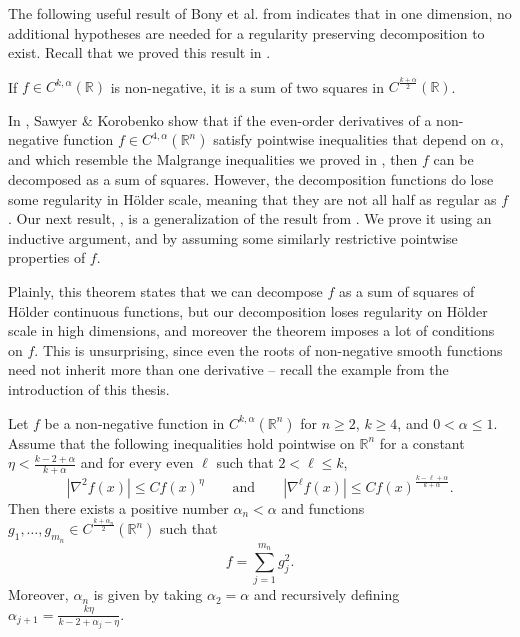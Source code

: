 \documentclass[oneside,hidelinks,indentfirst,10pt]{book}
\begin{document}
The following useful result of Bony et al. from \cite{Bony} indicates that in one dimension, no additional hypotheses are needed for a regularity preserving decomposition to exist. Recall that we proved this result in .


\begin{thm}[Bony]\label{thm:onedim}
If \(f\in C^{k,\alpha}(\mathbb{R})\) is non-negative, it is a sum of two squares in \(C^\frac{k+\alpha}{2}(\mathbb{R})\).
\end{thm}


In \cite[Theorem 4.5]{SOS_I}, Sawyer \& Korobenko show that if the even-order derivatives of a non-negative function \(f\in C^{4,\alpha}(\mathbb{R}^n)\) satisfy pointwise inequalities that depend on \(\alpha\), and which resemble the Malgrange inequalities we proved in , then \(f\) can be decomposed as a sum of squares. However, the decomposition functions do lose some regularity in H\"older scale, meaning that they are not all half as regular as \(f\). Our next result, , is a generalization of the result from \cite{SOS_I}. We prove it using an inductive argument, and by assuming some similarly restrictive pointwise properties of \(f\). 


Plainly, this theorem states that we can decompose \(f\) as a sum of squares of H\"older continuous functions, but our decomposition loses regularity on H\"older scale in high dimensions, and moreover the theorem imposes a lot of conditions on \(f\). This is unsurprising, since even the roots of non-negative smooth functions need not inherit more than one derivative -- recall the example from the introduction of this thesis. 


\begin{thm}\label{thm:seconddmain}
Let \(f\) be a non-negative function in \(C^{k,\alpha}(\mathbb{R}^n)\) for \(n\geq2\), \(k\geq 4\), and \(0<\alpha\leq 1\). Assume that the following inequalities hold pointwise on \(\mathbb{R}^n\) for a constant \(\eta<\frac{k-2+\alpha}{k+\alpha}\) and for every even \(\ell\) such that \(2<\ell\leq k\),
\begin{equation}\label{eq:induc}
    |\nabla^2 f(x)|\leq Cf(x)^\eta\qquad \textrm{and}\qquad|\nabla^\ell f(x)|\leq Cf(x)^\frac{k-\ell+\alpha}{k+\alpha}.
\end{equation}
Then there exists a positive number \(\alpha_n<\alpha\) and functions \(g_1,\dots,g_{m_n}\in C^\frac{k+\alpha_n}{2}(\mathbb{R}^n)\) such that
\[
    f=\sum_{j=1}^{m_n} g_j^2.
\]
Moreover, \(\alpha_n\) is given by taking \(\alpha_2=\alpha\) and recursively defining \(\alpha_{j+1}=\frac{k\eta}{k-2+\alpha_j-\eta}\).
\end{thm}
\end{document}
